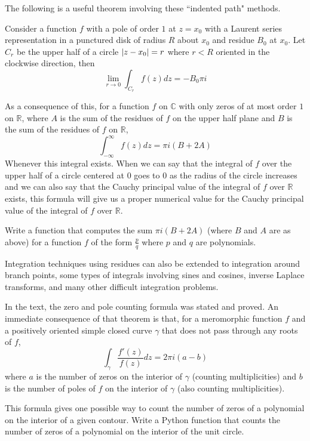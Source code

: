 The following is a useful theorem involving these ``indented path" methods.
\begin{theorem}
Consider a function $f$ with a pole of order $1$ at $z=x_0$ with a Laurent series representation in a punctured disk of radius $R$ about $x_0$ and residue $B_0$ at $x_0$.
Let $C_r$ be the upper half of a circle $\left\lvert z-x_0\right\rvert=r$ where $r<R$ oriented in the clockwise direction, then
\[\lim_{r\to 0} \int_{C_r} f(z) dz = - B_0 \pi i\]
\end{theorem}
As a consequence of this, for a function $f$ on $\mathbb{C}$ with only zeros of at most order $1$ on $\mathbb{R}$, where $A$ is the sum of the residues of $f$ on the upper half plane and $B$ is the sum of the residues of $f$ on $\mathbb{R}$,
\[\int_{-\infty}^{\infty} f(z) dz = \pi i (B+2A)\]
Whenever this integral exists.
When we can say that the integral of $f$ over the upper half of a circle centered at $0$ goes to $0$ as the radius of the circle increases and we can also say that the Cauchy principal value of the integral of $f$ over $\mathbb{R}$ exists, this formula will give us a proper numerical value for the Cauchy principal value of the integral of $f$ over $\mathbb{R}$.

\begin{problem}
Write a function that computes the sum $\pi i \left(B + 2 A\right)$ (where $B$ and $A$ are as above) for a function $f$ of the form $\frac{p}{q}$ where $p$ and $q$ are polynomials.
\end{problem}

Integration techniques using residues can also be extended to integration around branch points, some types of integrals involving sines and cosines, inverse Laplace transforms, and many other difficult integration problems.

\begin{problem}
In the text, the zero and pole counting formula was stated and proved.
An immediate consequence of that theorem is that, for a meromorphic function $f$ and a positively oriented simple closed curve $\gamma$ that does not pass through any roots of $f$,
\[\int_\gamma \frac{f'\left(z\right)}{f\left(z\right)} dz = 2 \pi i \left(a - b\right)\]
where $a$ is the number of zeros on the interior of $\gamma$ (counting multiplicities) and $b$ is the number of poles of $f$ on the interior of $\gamma$ (also counting multiplicities).

This formula gives one possible way to count the number of zeros of a polynomial on the interior of a given contour.
Write a Python function that counts the number of zeros of a polynomial on the interior of the unit circle.
\end{problem}